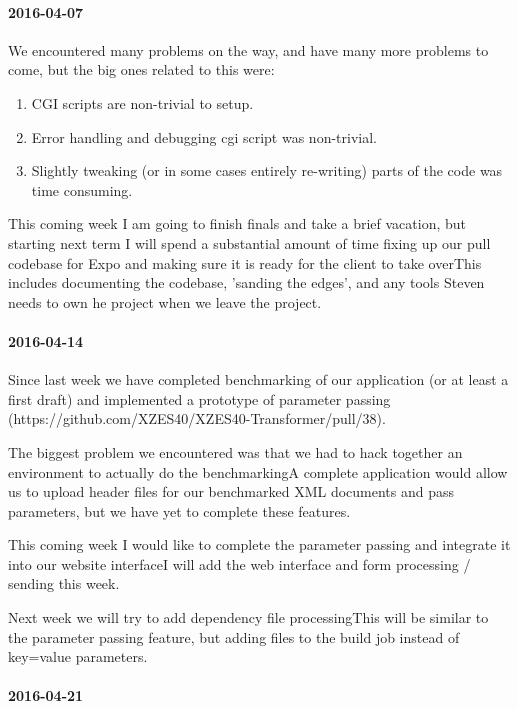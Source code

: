 \paragraph{2016-04-07}

We encountered many problems on the way, and have many more problems to come, but the big ones related to this were:

\begin{enumerate}
  \item CGI scripts are non-trivial to setup.
  \item Error handling and debugging cgi script was non-trivial.
  \item Slightly tweaking (or in some cases entirely re-writing) parts of the code was time consuming.
\end{enumerate}

This coming week I am going to finish finals and take a brief vacation, but starting next term I will spend a substantial amount of time fixing up our pull codebase for Expo and making sure it is ready for the client to take overThis includes documenting the codebase, 'sanding the edges', and any tools Steven needs to own he project when we leave the project.

\paragraph{2016-04-14}

Since last week we have completed benchmarking of our application (or at least a first draft) and implemented a prototype of parameter passing (https://github.com/XZES40/XZES40-Transformer/pull/38).

The biggest problem we encountered was that we had to hack together an environment to actually do the benchmarkingA complete application would allow us to upload header files for our benchmarked XML documents and pass parameters, but we have yet to complete these features.

This coming week I would like to complete the parameter passing and integrate it into our website interfaceI will add the web interface and form processing / sending this week.

Next week we will try to add dependency file processingThis will be similar to the parameter passing feature, but adding files to the build job instead of key=value parameters.

\paragraph{2016-04-21}

